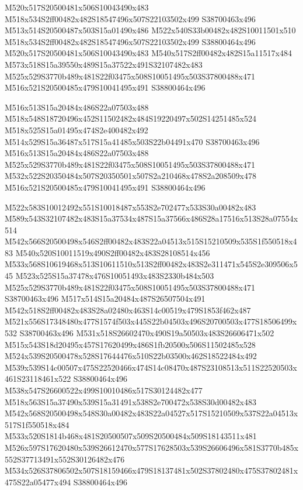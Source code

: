 \documentclass{article}
\begin{document}
\begin{multicols}{2}
M520x517S20500481x506S10043490x483 M518x534S2ff00482x482S18547496x507S22103502x499 S38700463x496 M513x514S20500487x503S15a01490x486 M522x540S33b00482x482S10011501x510 M518x534S2ff00482x482S18547496x507S22103502x499 S38800464x496 M520x517S20500481x506S10043490x483 M540x517S2ff00482x482S15a11517x484 M573x518S15a39550x489S15a37522x491S32107482x483 M525x529S3770b489x481S22f03475x508S10051495x503S37800488x471 M516x521S20500485x479S10041495x491 S38800464x496

M516x513S15a20484x486S22a07503x488 M518x548S18720496x452S11502482x484S19220497x502S14251485x524 M518x525S15a01495x474S2e400482x492 M514x529S15a36487x517S15a41485x503S22b04491x470 S38700463x496 M516x513S15a20484x486S22a07503x488 M525x529S3770b489x481S22f03475x508S10051495x503S37800488x471 M532x522S20350484x507S20350501x507S2a210468x478S2a208509x478 M516x521S20500485x479S10041495x491 S38800464x496

M522x583S10012492x551S10018487x553S2e702477x533S30a00482x483 M589x543S32107482x483S15a37534x487S15a37566x486S28a17516x513S28a07554x514 M542x566S20500498x546S2ff00482x483S22a04513x515S15210509x535S1f550518x483 M540x520S10011519x490S2ff00482x483S28108514x456 M533x568S10619468x513S10611510x513S2ff00482x483S2e311471x545S2e309506x545 M523x525S15a37478x476S10051493x483S2330b484x503 M525x529S3770b489x481S22f03475x508S10051495x503S37800488x471 S38700463x496 M517x514S15a20484x487S26507504x491 M542x518S2ff00482x483S28a02480x463S14c00519x479S1853f462x487 M521x556S17348480x477S1574f503x445S22b04503x496S20700503x477S18506499x532 S38700463x496 M531x518S26602470x490S19a50503x483S26606471x502 M515x543S18d20495x457S17620499x486S1fb20500x506S11502485x528 M524x539S20500478x528S17644476x510S22b03500x462S18522484x492 M539x539S14c00507x475S22520466x474S14c08470x487S23108513x511S22520503x461S23118461x522 S38800464x496 M538x547S26600522x499S10010486x517S30124482x477 M518x563S15a37490x539S15a31491x538S2e700472x538S30d00482x483 M542x568S20500498x548S30a00482x483S22a04527x517S15210509x537S22a04513x517S1f550518x484 M533x520S1814b468x481S20500507x509S20500484x509S18143511x481 M526x597S17620480x539S26612470x577S17628503x539S26606496x581S3770b485x552S37713491x552S30126482x476 M534x526S37806502x507S18159466x479S18137481x502S37802480x475S37802481x475S22a05477x494 S38800464x496


\end{multicols}
\end{document}
